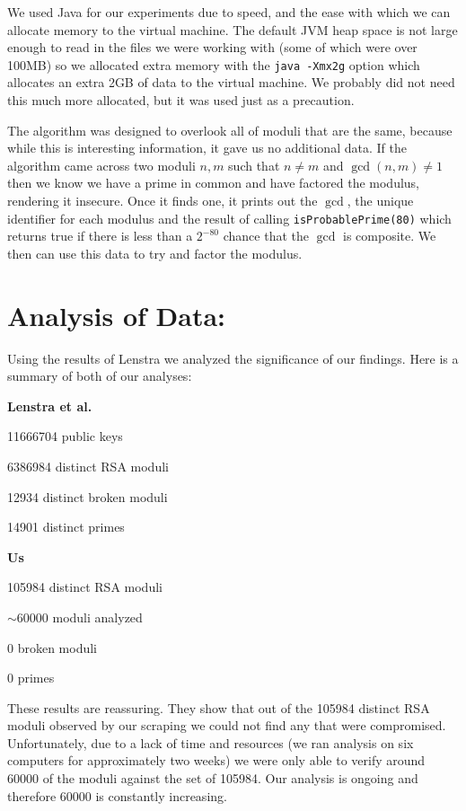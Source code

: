 \documentclass[11pt,twoside]{article}
\newcommand{\ty}[1]{\texttt{#1}}
\begin{document}
\begin{multicols}{2}
We used Java for our experiments due to speed, and the ease with which we can
allocate memory to the virtual machine. The default JVM heap space is not large
enough to read in the files we were working with (some of which were over 100MB)
so we allocated extra memory with the \ty{java -Xmx2g} option which allocates an
extra 2GB of data to the virtual machine. We probably did not need this much
more allocated, but it was used just as a precaution.

The algorithm was designed to overlook all of moduli that are the same, because
while this is interesting information, it gave us no additional data. If the
algorithm came across two moduli $n,m$ such that $n \neq m$ and $\gcd(n,m) \neq
1$ then we know we have a prime in common and have factored the modulus,
rendering it insecure. Once it finds one, it prints out the $\gcd$, the unique
identifier for each modulus and the result of calling \ty{isProbablePrime(80)}
which returns true if there is less than a $2^{-80}$ chance that the $\gcd$ is
composite. We then can use this data to try and factor the modulus.

\section{Analysis of Data:}
Using the results of Lenstra we analyzed the significance
of our findings. Here is a summary of both of our analyses:

\textbf{Lenstra et al.}
\begin{compactitem}
\item 11666704 public keys
\item 6386984 distinct RSA moduli
\item 12934 distinct broken moduli
\item 14901 distinct primes
\end{compactitem}

\textbf{Us}
\begin{compactitem}
\item 105984 distinct RSA moduli
\item $\sim$60000 moduli analyzed
\item 0 broken moduli
\item 0 primes
\end{compactitem}

These results are reassuring. They show that out of the 105984 distinct RSA
moduli observed by our scraping we could not find any that were compromised.
Unfortunately, due to a lack of time and resources (we ran analysis on six
computers for approximately two weeks) we were only able to verify around 60000
of the moduli against the set of 105984. Our analysis is ongoing and therefore
60000 is constantly increasing. 


\end{multicols}
\end{document}
